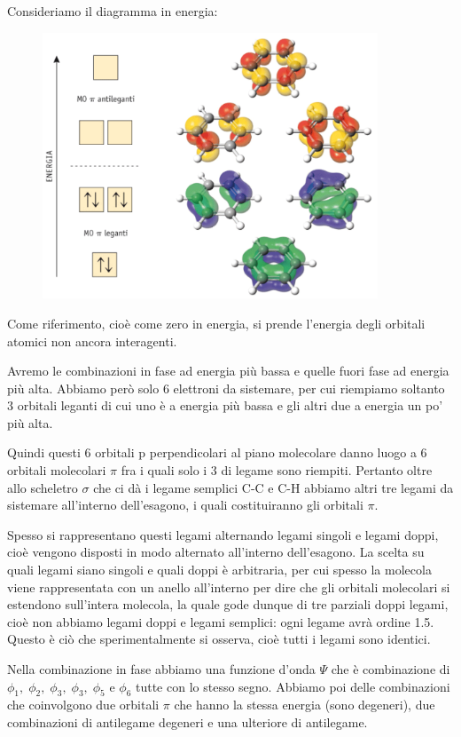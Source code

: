 Consideriamo il diagramma in energia:

\begin{figure}[htp]
    \centering
    \includegraphics[width=10cm]{immagini/orbitali_molecolari_benzene.png}
\end{figure}

Come riferimento, cioè come zero in energia, si prende l'energia degli orbitali atomici non ancora interagenti.

Avremo le combinazioni in fase ad energia più bassa e quelle fuori fase ad energia più alta. Abbiamo però solo 6 elettroni da sistemare, per cui riempiamo soltanto 3 orbitali leganti di cui uno è a energia più bassa e gli altri due a energia un po' più alta. 
    
Quindi questi 6 orbitali p perpendicolari al piano molecolare danno luogo a 6 orbitali molecolari $\pi$ fra i quali solo i 3 di legame sono riempiti. Pertanto oltre allo scheletro $\sigma$ che ci dà i legame semplici C-C e C-H abbiamo altri tre legami da sistemare all'interno dell'esagono, i quali costituiranno gli orbitali $\pi$.
    
Spesso si rappresentano questi legami alternando legami singoli e legami doppi, cioè vengono disposti in modo alternato all'interno dell'esagono. La scelta su quali legami siano singoli e quali doppi è arbitraria, per cui spesso la molecola viene rappresentata con un anello all'interno per dire che gli orbitali molecolari si estendono sull'intera molecola, la quale gode dunque di tre parziali doppi legami, cioè non abbiamo legami doppi e legami semplici: ogni legame avrà ordine 1.5. Questo è ciò che sperimentalmente si osserva, cioè tutti i legami sono identici.

Nella combinazione in fase abbiamo una funzione d'onda $\Psi$ che è combinazione di  $\phi_1 , \; \phi_2 , \; \phi_3 , \; \phi_3 , \; \phi_5$ e $\phi_6$ tutte con lo stesso segno. Abbiamo poi delle combinazioni che coinvolgono due orbitali $\pi$ che hanno la stessa energia (sono degeneri), due combinazioni di antilegame degeneri e una ulteriore di antilegame.


